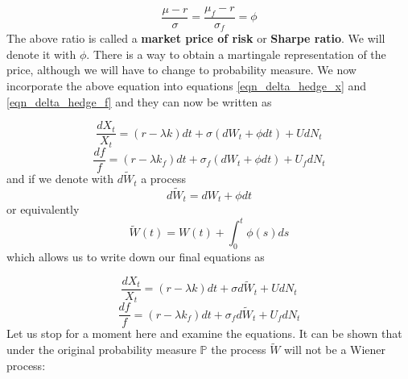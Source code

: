 \documentclass[times, utf8, diplomski]{fer}
\begin{document}
\begin{equation} \label{eqn_sharpe}
	\frac{\mu - r}{\sigma} = \frac{\mu_f - r}{\sigma_f} = \phi
\end{equation}
The above ratio is called a \textbf{market price of risk} or  \textbf{Sharpe ratio}. We will denote it with $\phi$. There is a way to obtain a martingale representation of the price, although we will have to change to probability measure. We now incorporate the above equation into equations \ref{eqn_delta_hedge_x} and \ref{eqn_delta_hedge_f} and they can now be written as

$$ \frac{dX_t}{X_t} = (r - \lambda k)dt + \sigma (dW_t + \phi dt) + UdN_t $$
$$ \frac{df}{f} = (r - \lambda k_f)dt + \sigma_f (dW_t + \phi dt) + U_fdN_t $$
and if we denote with $d\tilde{W}_t$ a process
\begin{equation}
	d\tilde{W}_t = dW_t + \phi dt
\end{equation} or equivalently
\begin{equation}
	\tilde{W}(t) = W(t) + \int_0^t \phi(s) ds
\end{equation} which allows us to write down our final equations as

\begin{equation}\label{eqn_x_new_measure}
	\frac{dX_t}{X_t} = (r - \lambda k)dt + \sigma d\tilde{W}_t + UdN_t
\end{equation}
\begin{equation}
	\frac{df}{f} = (r - \lambda k_f)dt + \sigma_f d\tilde{W}_t + U_fdN_t
\end{equation}
Let us stop for a moment here and examine the equations. It can be shown that under the original probability measure $\mathbb{P}$ the process $\tilde{W}$ will not be a Wiener process:
\end{document}
